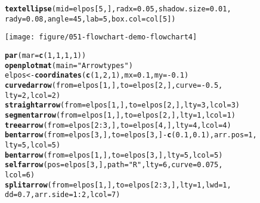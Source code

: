\documentclass{article}\usepackage[]{graphicx}\usepackage[]{color}
\makeatletter
\def\maxwidth{ %
  \ifdim\Gin@nat@width>\linewidth
    \linewidth
  \else
    \Gin@nat@width
  \fi
}
\newcommand{\hlnum}[1]{\textcolor[rgb]{0.686,0.059,0.569}{#1}}%
\newcommand{\hlstr}[1]{\textcolor[rgb]{0.192,0.494,0.8}{#1}}%
\newcommand{\hlopt}[1]{\textcolor[rgb]{0,0,0}{#1}}%
\newcommand{\hlstd}[1]{\textcolor[rgb]{0.345,0.345,0.345}{#1}}%
\newcommand{\hlkwb}[1]{\textcolor[rgb]{0.69,0.353,0.396}{#1}}%
\newcommand{\hlkwc}[1]{\textcolor[rgb]{0.333,0.667,0.333}{#1}}%
\newcommand{\hlkwd}[1]{\textcolor[rgb]{0.737,0.353,0.396}{\textbf{#1}}}%
\newenvironment{kframe}{%
 \def\at@end@of@kframe{}%
 \ifinner\ifhmode%
  \def\at@end@of@kframe{\end{minipage}}%
  \begin{minipage}{\columnwidth}%
 \fi\fi%
 \def\FrameCommand##1{\hskip\@totalleftmargin \hskip-\fboxsep
 \colorbox{shadecolor}{##1}\hskip-\fboxsep
     \hskip-\linewidth \hskip-\@totalleftmargin \hskip\columnwidth}%
 \MakeFramed {\advance\hsize-\width
   \@totalleftmargin\z@ \linewidth\hsize
   \@setminipage}}%
 {\par\unskip\endMakeFramed%
 \at@end@of@kframe}
\newenvironment{knitrout}{}{} %
\makeatother
\begin{document}
\begin{knitrout}
\begin{kframe}
\begin{alltt}
\hlkwd{textellipse}\hlstd{(}\hlkwc{mid} \hlstd{= elpos[}\hlnum{5}\hlstd{, ],} \hlkwc{radx} \hlstd{=} \hlnum{0.05}\hlstd{,} \hlkwc{shadow.size} \hlstd{=} \hlnum{0.01}\hlstd{,}
    \hlkwc{rady} \hlstd{=} \hlnum{0.08}\hlstd{,} \hlkwc{angle} \hlstd{=} \hlnum{45}\hlstd{,} \hlkwc{lab} \hlstd{=} \hlnum{5}\hlstd{,} \hlkwc{box.col} \hlstd{= col[}\hlnum{5}\hlstd{])}
\end{alltt}
\end{kframe}
\texttt{[image: figure/051-flowchart-demo-flowchart4]} 
\begin{kframe}\begin{alltt}
\hlkwd{par}\hlstd{(}\hlkwc{mar} \hlstd{=} \hlkwd{c}\hlstd{(}\hlnum{1}\hlstd{,} \hlnum{1}\hlstd{,} \hlnum{1}\hlstd{,} \hlnum{1}\hlstd{))}
\hlkwd{openplotmat}\hlstd{(}\hlkwc{main} \hlstd{=} \hlstr{"Arrowtypes"}\hlstd{)}
\hlstd{elpos} \hlkwb{<-} \hlkwd{coordinates}\hlstd{(}\hlkwd{c}\hlstd{(}\hlnum{1}\hlstd{,} \hlnum{2}\hlstd{,} \hlnum{1}\hlstd{),} \hlkwc{mx} \hlstd{=} \hlnum{0.1}\hlstd{,} \hlkwc{my} \hlstd{=} \hlopt{-}\hlnum{0.1}\hlstd{)}
\hlkwd{curvedarrow}\hlstd{(}\hlkwc{from} \hlstd{= elpos[}\hlnum{1}\hlstd{, ],} \hlkwc{to} \hlstd{= elpos[}\hlnum{2}\hlstd{, ],} \hlkwc{curve} \hlstd{=} \hlopt{-}\hlnum{0.5}\hlstd{,}
    \hlkwc{lty} \hlstd{=} \hlnum{2}\hlstd{,} \hlkwc{lcol} \hlstd{=} \hlnum{2}\hlstd{)}
\hlkwd{straightarrow}\hlstd{(}\hlkwc{from} \hlstd{= elpos[}\hlnum{1}\hlstd{, ],} \hlkwc{to} \hlstd{= elpos[}\hlnum{2}\hlstd{, ],} \hlkwc{lty} \hlstd{=} \hlnum{3}\hlstd{,} \hlkwc{lcol} \hlstd{=} \hlnum{3}\hlstd{)}
\hlkwd{segmentarrow}\hlstd{(}\hlkwc{from} \hlstd{= elpos[}\hlnum{1}\hlstd{, ],} \hlkwc{to} \hlstd{= elpos[}\hlnum{2}\hlstd{, ],} \hlkwc{lty} \hlstd{=} \hlnum{1}\hlstd{,} \hlkwc{lcol} \hlstd{=} \hlnum{1}\hlstd{)}
\hlkwd{treearrow}\hlstd{(}\hlkwc{from} \hlstd{= elpos[}\hlnum{2}\hlopt{:}\hlnum{3}\hlstd{, ],} \hlkwc{to} \hlstd{= elpos[}\hlnum{4}\hlstd{, ],} \hlkwc{lty} \hlstd{=} \hlnum{4}\hlstd{,} \hlkwc{lcol} \hlstd{=} \hlnum{4}\hlstd{)}
\hlkwd{bentarrow}\hlstd{(}\hlkwc{from} \hlstd{= elpos[}\hlnum{3}\hlstd{, ],} \hlkwc{to} \hlstd{= elpos[}\hlnum{3}\hlstd{, ]} \hlopt{-} \hlkwd{c}\hlstd{(}\hlnum{0.1}\hlstd{,} \hlnum{0.1}\hlstd{),} \hlkwc{arr.pos} \hlstd{=} \hlnum{1}\hlstd{,}
    \hlkwc{lty} \hlstd{=} \hlnum{5}\hlstd{,} \hlkwc{lcol} \hlstd{=} \hlnum{5}\hlstd{)}
\hlkwd{bentarrow}\hlstd{(}\hlkwc{from} \hlstd{= elpos[}\hlnum{1}\hlstd{, ],} \hlkwc{to} \hlstd{= elpos[}\hlnum{3}\hlstd{, ],} \hlkwc{lty} \hlstd{=} \hlnum{5}\hlstd{,} \hlkwc{lcol} \hlstd{=} \hlnum{5}\hlstd{)}
\hlkwd{selfarrow}\hlstd{(}\hlkwc{pos} \hlstd{= elpos[}\hlnum{3}\hlstd{, ],} \hlkwc{path} \hlstd{=} \hlstr{"R"}\hlstd{,} \hlkwc{lty} \hlstd{=} \hlnum{6}\hlstd{,} \hlkwc{curve} \hlstd{=} \hlnum{0.075}\hlstd{,}
    \hlkwc{lcol} \hlstd{=} \hlnum{6}\hlstd{)}
\hlkwd{splitarrow}\hlstd{(}\hlkwc{from} \hlstd{= elpos[}\hlnum{1}\hlstd{, ],} \hlkwc{to} \hlstd{= elpos[}\hlnum{2}\hlopt{:}\hlnum{3}\hlstd{, ],} \hlkwc{lty} \hlstd{=} \hlnum{1}\hlstd{,} \hlkwc{lwd} \hlstd{=} \hlnum{1}\hlstd{,}
    \hlkwc{dd} \hlstd{=} \hlnum{0.7}\hlstd{,} \hlkwc{arr.side} \hlstd{=} \hlnum{1}\hlopt{:}\hlnum{2}\hlstd{,} \hlkwc{lcol} \hlstd{=} \hlnum{7}\hlstd{)}


\end{alltt}
\end{kframe}
\end{knitrout}
\end{document}
